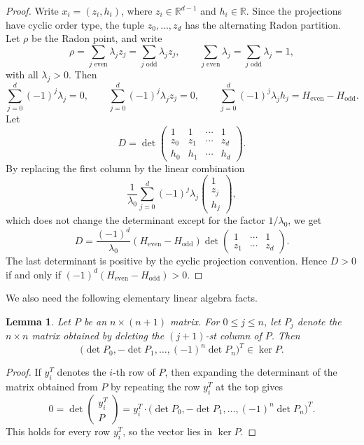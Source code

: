 \documentclass[11pt]{article}
\newtheorem{lemma}[theorem]{Lemma}
\begin{document}
\begin{proof}
Write $x_i=(z_i,h_i)$, where $z_i\in\mathbb R^{d-1}$ and $h_i\in\mathbb R$.
Since the projections have cyclic order type, the tuple $z_0,\ldots,z_d$ has
the alternating Radon partition. Let $\rho$ be the Radon point, and write
\[
\rho=\sum_{j\text{ even}}\lambda_jz_j
=
\sum_{j\text{ odd}}\lambda_jz_j,
\qquad
\sum_{j\text{ even}}\lambda_j=
\sum_{j\text{ odd}}\lambda_j=1,
\]
with all $\lambda_j>0$. Then
\[
\sum_{j=0}^d(-1)^j\lambda_j=0,
\qquad
\sum_{j=0}^d(-1)^j\lambda_jz_j=0,
\qquad
\sum_{j=0}^d(-1)^j\lambda_jh_j=H_{\mathrm{even}}-H_{\mathrm{odd}}.
\]
Let
\[
D=
\det
\begin{pmatrix}
1&1&\cdots&1\\
z_0&z_1&\cdots&z_d\\
h_0&h_1&\cdots&h_d
\end{pmatrix}.
\]
By replacing the first column by the linear combination
\[
\frac{1}{\lambda_0}\sum_{j=0}^d(-1)^j\lambda_j
\begin{pmatrix}1\\ z_j\\ h_j\end{pmatrix},
\]
which does not change the determinant except for the factor $1/\lambda_0$, we get
\[
D=
\frac{(-1)^d}{\lambda_0}(H_{\mathrm{even}}-H_{\mathrm{odd}})
\det
\begin{pmatrix}
1&\cdots&1\\
z_1&\cdots&z_d
\end{pmatrix}.
\]
The last determinant is positive by the cyclic projection convention. Hence
$D>0$ if and only if $(-1)^d(H_{\mathrm{even}}-H_{\mathrm{odd}})>0$.
\end{proof}

We also need the following elementary linear algebra facts.

\begin{lemma}\label{lem:cramer}
Let $P$ be an $n\times(n+1)$ matrix. For $0\le j\le n$, let $P_j$ denote the
$n\times n$ matrix obtained by deleting the $(j+1)$-st column of $P$. Then
\[
\bigl(\det P_0,-\det P_1,\ldots,(-1)^n\det P_n\bigr)^T\in \ker P.
\]
\end{lemma}

\begin{proof}
If $y_i^T$ denotes the $i$-th row of $P$, then expanding the determinant of the
matrix obtained from $P$ by repeating the row $y_i^T$ at the top gives
\[
0=
\det
\begin{pmatrix}
y_i^T\\ P
\end{pmatrix}
=
y_i^T\cdot
\bigl(\det P_0,-\det P_1,\ldots,(-1)^n\det P_n\bigr)^T.
\]
This holds for every row $y_i^T$, so the vector lies in $\ker P$.
\end{proof}
\end{document}
